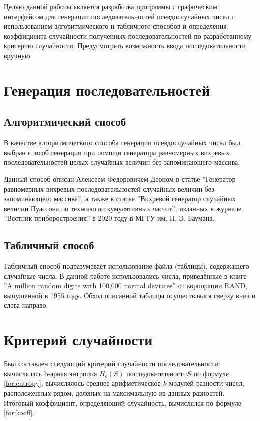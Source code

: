  Целью данной работы является разработка программы с графическим интерфейсом для генерации последовательностей псевдослучайных чисел с использованием алгоритмического и табличного способов и определения коэффициента случайности полученных последовательностей по разработанному критерию случайности. Предусмотреть возможность ввода последовательности вручную.

\section*{Генерация последовательностей}

\subsection*{Алгоритмический способ}

В качестве алгоритмического способа генерации псевдослучайных чисел был выбран способ генерации при помощи генератора равномерных вихревых последовательностей целых случайных величин без запоминающего массива.

Данный способ описан Алексеем Фёдоровичем Деоном в статье ''Генератор равномерных вихревых последовательностей случайных величин без запоминающего массива'', а также в статье ''Вихревой генератор случайных величин Пуассона  по технологии кумулятивных частот'', изданных в журнале ''Вестник приборостроения'' в 2020 году в МГТУ им. Н. Э. Баумана.

	

\subsection*{Табличный способ}

Табличный способ подразумевает использование файла (таблицы), содержащего случайные числа.
В данной работе использовались числа, приведённые в книге ''A million random digits with 100,000 normal deviates'' от корпорации RAND, выпущенной в 1955 году. Обход описанной таблицы осуществлялся сверху вниз и слева направо.

\section*{Критерий случайности}

Был составлен следующий критерий случайности последовательности: вычислялась b-арная энтропия $H_b(S)$ последовательности$S$ по формуле \ref{for:entropy}, вычислялось среднее арифметическое $k$ модулей разности чисел, расположенных рядом, делёных на максимальную из данных разностей. Итоговый коэффициент, определяющий случайность, вычислялся по формуле \ref{for:koeff}.

